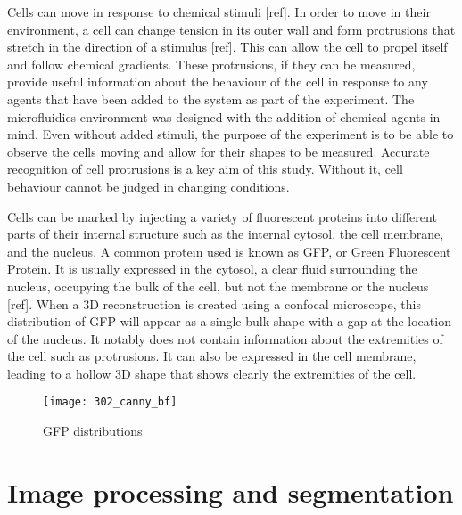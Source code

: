 Cells can move in response to chemical stimuli [ref]. In order to move in their environment, a cell can change tension in its outer wall and form protrusions that stretch in the direction of a stimulus [ref]. This can allow the cell to propel itself and follow chemical gradients. These protrusions, if they can be measured, provide useful information about the behaviour of the cell in response to any agents that have been added to the system as part of the experiment. The microfluidics environment was designed with the addition of chemical agents in mind. Even without added stimuli, the purpose of the experiment is to be able to observe the cells moving and allow for their shapes to be measured. Accurate recognition of cell protrusions is a key aim of this study. Without it, cell behaviour cannot be judged in changing conditions.

Cells can be marked by injecting a variety of fluorescent proteins into different parts of their internal structure such as the internal cytosol, the cell membrane, and the nucleus. A common protein used is known as GFP, or Green Fluorescent Protein. It is usually expressed in the cytosol, a clear fluid surrounding the nucleus, occupying the bulk of the cell, but not the membrane or the nucleus [ref]. When a 3D reconstruction is created using a confocal microscope, this distribution of GFP will appear as a single bulk shape with a gap at the location of the nucleus. It notably does not contain information about the extremities of the cell such as protrusions. It can also be expressed in the cell membrane, leading to a hollow 3D shape that shows clearly the extremities of the cell.

\begin{figure}[p]
 \centering
 \texttt{[image: 302\_canny\_bf]}
 \caption{
	 GFP distributions
 }
 \label{fig:gfpdistributions}
\end{figure}

\section{Image processing and segmentation}

